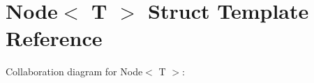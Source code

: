 \hypertarget{structNode}{}\section{Node$<$ T $>$ Struct Template Reference}
\label{structNode}


Collaboration diagram for Node$<$ T $>$\+:
